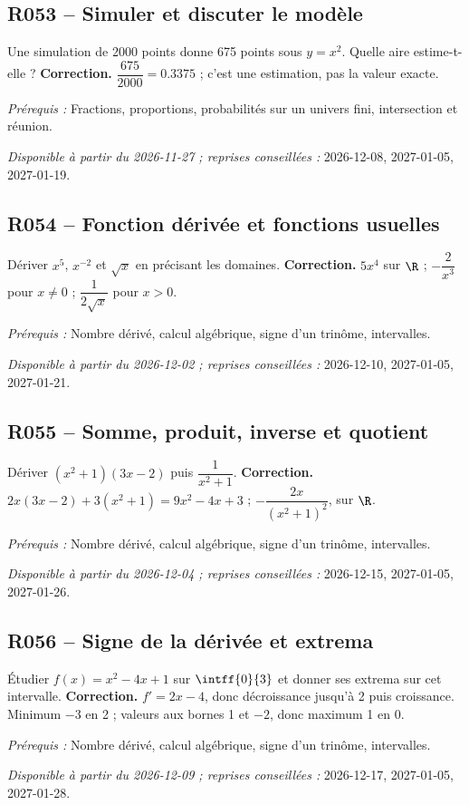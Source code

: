 \subsection*{R053 -- Simuler et discuter le modèle}\label{R053}
Une simulation de 2000 points donne 675 points sous $y=x^2$. Quelle aire estime-t-elle ?
\ifmxteacher\textbf{Correction.} $\dfrac{675}{2000}=\num{0,3375}$ ; c’est une estimation, pas la valeur exacte.\par\textit{Prérequis :} Fractions, proportions, probabilités sur un univers fini, intersection et réunion.\par\textit{Disponible à partir du 2026-11-27 ; reprises conseillées :} 2026-12-08, 2027-01-05, 2027-01-19.\fi
{}\subsection*{R054 -- Fonction dérivée et fonctions usuelles}\label{R054}
Dériver $x^5$, $x^{-2}$ et $\sqrt x$ en précisant les domaines.
\ifmxteacher\textbf{Correction.} $5x^4$ sur $\R$ ; $-\dfrac{2}{x^3}$ pour $x\ne0$ ; $\dfrac{1}{2\sqrt x}$ pour $x>0$.\par\textit{Prérequis :} Nombre dérivé, calcul algébrique, signe d’un trinôme, intervalles.\par\textit{Disponible à partir du 2026-12-02 ; reprises conseillées :} 2026-12-10, 2027-01-05, 2027-01-21.\fi
{}\subsection*{R055 -- Somme, produit, inverse et quotient}\label{R055}
Dériver $(x^2+1)(3x-2)$ puis $\dfrac{1}{x^2+1}$.
\ifmxteacher\textbf{Correction.} $2x(3x-2)+3(x^2+1)=9x^2-4x+3$ ; $-\dfrac{2x}{(x^2+1)^2}$, sur $\R$.\par\textit{Prérequis :} Nombre dérivé, calcul algébrique, signe d’un trinôme, intervalles.\par\textit{Disponible à partir du 2026-12-04 ; reprises conseillées :} 2026-12-15, 2027-01-05, 2027-01-26.\fi
{}\subsection*{R056 -- Signe de la dérivée et extrema}\label{R056}
Étudier $f(x)=x^2-4x+1$ sur $\intff{0}{3}$ et donner ses extrema sur cet intervalle.
\ifmxteacher\textbf{Correction.} $f\prime=2x-4$, donc décroissance jusqu’à 2 puis croissance. Minimum $-3$ en 2 ; valeurs aux bornes 1 et $-2$, donc maximum 1 en 0.\par\textit{Prérequis :} Nombre dérivé, calcul algébrique, signe d’un trinôme, intervalles.\par\textit{Disponible à partir du 2026-12-09 ; reprises conseillées :} 2026-12-17, 2027-01-05, 2027-01-28.\fi
